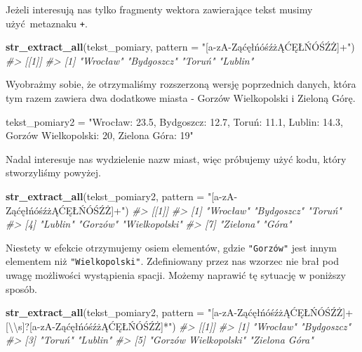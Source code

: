 \documentclass[paper=6in:9in,pagesize=pdftex,headinclude=on,footinclude=on,10pt]{scrbook}
\newenvironment{Shaded}{\begin{snugshade}}{\end{snugshade}}
\newcommand{\CharTok}[1]{\textcolor[rgb]{0.31,0.60,0.02}{#1}}
\newcommand{\CommentTok}[1]{\textcolor[rgb]{0.56,0.35,0.01}{\textit{#1}}}
\newcommand{\DataTypeTok}[1]{\textcolor[rgb]{0.13,0.29,0.53}{#1}}
\newcommand{\KeywordTok}[1]{\textcolor[rgb]{0.13,0.29,0.53}{\textbf{#1}}}
\newcommand{\NormalTok}[1]{#1}
\newcommand{\StringTok}[1]{\textcolor[rgb]{0.31,0.60,0.02}{#1}}
\begin{document}
Jeżeli interesują nas tylko fragmenty wektora zawierające tekst musimy użyć~metaznaku \texttt{+}.

\begin{Shaded}
\begin{Highlighting}[]
\KeywordTok{str_extract_all}\NormalTok{(tekst_pomiary, }\DataTypeTok{pattern =} \StringTok{"[a-zA-ZąćęłńóśźżĄĆĘŁŃÓŚŹŻ]+"}\NormalTok{)}
\CommentTok{#> [[1]]}
\CommentTok{#> [1] "Wrocław"   "Bydgoszcz" "Toruń"     "Lublin"}
\end{Highlighting}
\end{Shaded}

Wyobrażmy sobie, że otrzymaliśmy rozszerzoną wersję poprzednich danych, która tym razem zawiera dwa dodatkowe miasta - Gorzów Wielkopolski i Zieloną Górę.

\begin{Shaded}
\begin{Highlighting}[]
\NormalTok{tekst_pomiary2 =}\StringTok{ "Wrocław: 23.5, Bydgoszcz: 12.7, Toruń: 11.1, Lublin: 14.3, }
\StringTok{Gorzów Wielkopolski: 20, Zielona Góra: 19"}
\end{Highlighting}
\end{Shaded}

Nadal interesuje nas wydzielenie nazw miast, więc próbujemy użyć kodu, który stworzyliśmy powyżej.

\begin{Shaded}
\begin{Highlighting}[]
\KeywordTok{str_extract_all}\NormalTok{(tekst_pomiary2, }\DataTypeTok{pattern =} \StringTok{"[a-zA-ZąćęłńóśźżĄĆĘŁŃÓŚŹŻ]+"}\NormalTok{)}
\CommentTok{#> [[1]]}
\CommentTok{#> [1] "Wrocław"      "Bydgoszcz"    "Toruń"       }
\CommentTok{#> [4] "Lublin"       "Gorzów"       "Wielkopolski"}
\CommentTok{#> [7] "Zielona"      "Góra"}
\end{Highlighting}
\end{Shaded}

Niestety w efekcie otrzymujemy osiem elementów, gdzie \texttt{"Gorzów"} jest innym elementem niż \texttt{"Wielkopolski"}.
Zdefiniowany przez nas wzorzec nie brał pod uwagę możliwości wystąpienia spacji.
Możemy naprawić tę sytuację w poniższy sposób.

\begin{Shaded}
\begin{Highlighting}[]
\KeywordTok{str_extract_all}\NormalTok{(tekst_pomiary2, }
       \DataTypeTok{pattern =} \StringTok{"[a-zA-ZąćęłńóśźżĄĆĘŁŃÓŚŹŻ]+[}\CharTok{\textbackslash{}\textbackslash{}}\StringTok{s]?[a-zA-ZąćęłńóśźżĄĆĘŁŃÓŚŹŻ]*"}\NormalTok{)}
\CommentTok{#> [[1]]}
\CommentTok{#> [1] "Wrocław"             "Bydgoszcz"          }
\CommentTok{#> [3] "Toruń"               "Lublin"             }
\CommentTok{#> [5] "Gorzów Wielkopolski" "Zielona Góra"}
\end{Highlighting}
\end{Shaded}
\end{document}
